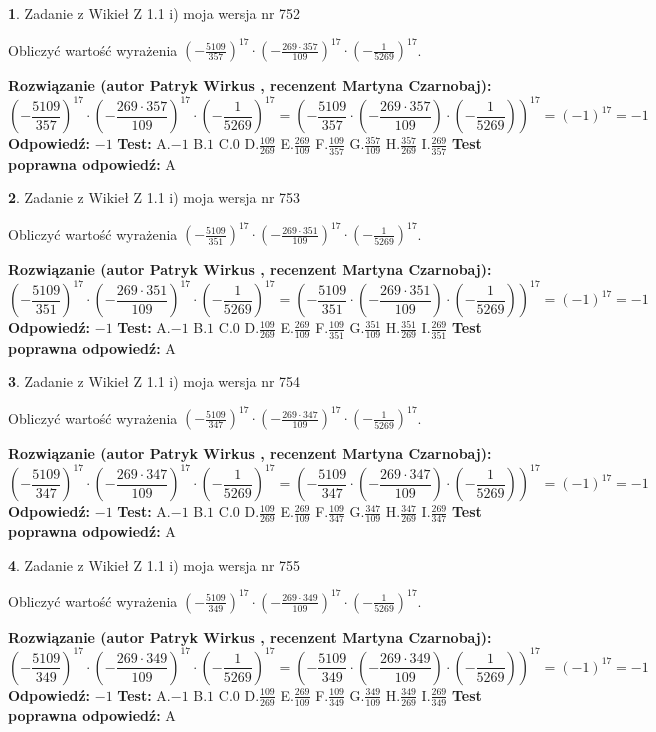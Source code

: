 \documentclass[12pt, a4paper]{article}
\theoremstyle{definition} %
\newtheorem{zad}{}
\newcommand{\zadStart}[1]{\begin{zad}#1\newline}
\newcommand{\zadStop}{\end{zad}}
\newcommand{\rozwStart}[2]{\noindent \textbf{Rozwiązanie (autor #1 , recenzent #2): }\newline}
\newcommand{\rozwStop}{\newline}
\newcommand{\odpStart}{\noindent \textbf{Odpowiedź:}\newline}
\newcommand{\odpStop}{\newline}
\newcommand{\testStart}{\noindent \textbf{Test:}\newline}
\newcommand{\testStop}{\newline}
\newcommand{\kluczStart}{\noindent \textbf{Test poprawna odpowiedź:}\newline}
\newcommand{\kluczStop}{\newline}
\begin{document}
\zadStart{Zadanie z Wikieł Z 1.1 i) moja wersja nr 752}

Obliczyć wartość wyrażenia $(-\frac{5109}{357})^{17} \cdot (-\frac{269 \cdot 357}{109})^{17} \cdot (-\frac{1}{5269})^{17}$.
\zadStop
\rozwStart{Patryk Wirkus}{Martyna Czarnobaj}
$$(-\frac{5109}{357})^{17} \cdot (-\frac{269 \cdot 357}{109})^{17} \cdot (-\frac{1}{5269})^{17} = (-\frac{5109}{357} \cdot (-\frac{269 \cdot 357}{109}) \cdot (-\frac{1}{5269}))^{17} = (-1)^{17} = -1$$
\rozwStop
\odpStart
$-1$
\odpStop
\testStart
A.$-1$ B.$1$ C.$0$ D.$\frac{109}{269}$ E.$\frac{269}{109}$
F.$\frac{109}{357}$ G.$\frac{357}{109}$
H.$\frac{357}{269}$
I.$\frac{269}{357}$
\testStop
\kluczStart
A
\kluczStop



\zadStart{Zadanie z Wikieł Z 1.1 i) moja wersja nr 753}

Obliczyć wartość wyrażenia $(-\frac{5109}{351})^{17} \cdot (-\frac{269 \cdot 351}{109})^{17} \cdot (-\frac{1}{5269})^{17}$.
\zadStop
\rozwStart{Patryk Wirkus}{Martyna Czarnobaj}
$$(-\frac{5109}{351})^{17} \cdot (-\frac{269 \cdot 351}{109})^{17} \cdot (-\frac{1}{5269})^{17} = (-\frac{5109}{351} \cdot (-\frac{269 \cdot 351}{109}) \cdot (-\frac{1}{5269}))^{17} = (-1)^{17} = -1$$
\rozwStop
\odpStart
$-1$
\odpStop
\testStart
A.$-1$ B.$1$ C.$0$ D.$\frac{109}{269}$ E.$\frac{269}{109}$
F.$\frac{109}{351}$ G.$\frac{351}{109}$
H.$\frac{351}{269}$
I.$\frac{269}{351}$
\testStop
\kluczStart
A
\kluczStop



\zadStart{Zadanie z Wikieł Z 1.1 i) moja wersja nr 754}

Obliczyć wartość wyrażenia $(-\frac{5109}{347})^{17} \cdot (-\frac{269 \cdot 347}{109})^{17} \cdot (-\frac{1}{5269})^{17}$.
\zadStop
\rozwStart{Patryk Wirkus}{Martyna Czarnobaj}
$$(-\frac{5109}{347})^{17} \cdot (-\frac{269 \cdot 347}{109})^{17} \cdot (-\frac{1}{5269})^{17} = (-\frac{5109}{347} \cdot (-\frac{269 \cdot 347}{109}) \cdot (-\frac{1}{5269}))^{17} = (-1)^{17} = -1$$
\rozwStop
\odpStart
$-1$
\odpStop
\testStart
A.$-1$ B.$1$ C.$0$ D.$\frac{109}{269}$ E.$\frac{269}{109}$
F.$\frac{109}{347}$ G.$\frac{347}{109}$
H.$\frac{347}{269}$
I.$\frac{269}{347}$
\testStop
\kluczStart
A
\kluczStop



\zadStart{Zadanie z Wikieł Z 1.1 i) moja wersja nr 755}

Obliczyć wartość wyrażenia $(-\frac{5109}{349})^{17} \cdot (-\frac{269 \cdot 349}{109})^{17} \cdot (-\frac{1}{5269})^{17}$.
\zadStop
\rozwStart{Patryk Wirkus}{Martyna Czarnobaj}
$$(-\frac{5109}{349})^{17} \cdot (-\frac{269 \cdot 349}{109})^{17} \cdot (-\frac{1}{5269})^{17} = (-\frac{5109}{349} \cdot (-\frac{269 \cdot 349}{109}) \cdot (-\frac{1}{5269}))^{17} = (-1)^{17} = -1$$
\rozwStop
\odpStart
$-1$
\odpStop
\testStart
A.$-1$ B.$1$ C.$0$ D.$\frac{109}{269}$ E.$\frac{269}{109}$
F.$\frac{109}{349}$ G.$\frac{349}{109}$
H.$\frac{349}{269}$
I.$\frac{269}{349}$
\testStop
\kluczStart
A
\kluczStop
\end{document}
